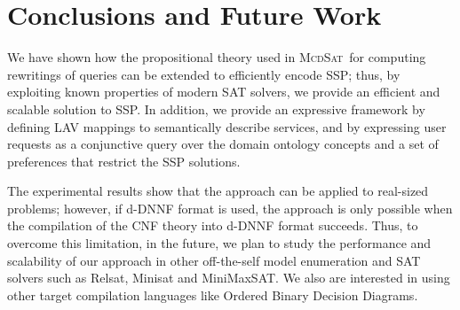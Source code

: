 \documentclass{llncs}
\newcommand{\mcdsat}{\textsc{McdSat}}
\begin{document}
\section{Conclusions and Future Work}
We have shown how the propositional theory used in \mcdsat\  for
computing rewritings of queries can be extended to efficiently encode
SSP; thus, by exploiting known properties of modern SAT solvers, we
provide an efficient and scalable solution to SSP. In addition, we
provide an expressive framework by defining LAV mappings to semantically
describe services, and by expressing user requests as a conjunctive
query over the domain ontology concepts and a set of preferences that
restrict the SSP solutions.

The experimental results show that the approach can be applied to
real-sized problems; however, if d-DNNF format is used, the approach
is only possible when the compilation of the CNF theory into d-DNNF
format succeeds. Thus, to overcome this limitation, in the future, we
plan to study the performance and scalability of our approach in
other off-the-self model enumeration and SAT solvers such as Relsat,
Minisat and MiniMaxSAT. We also are interested in using other target
compilation languages like Ordered Binary Decision Diagrams.



\end{document}
